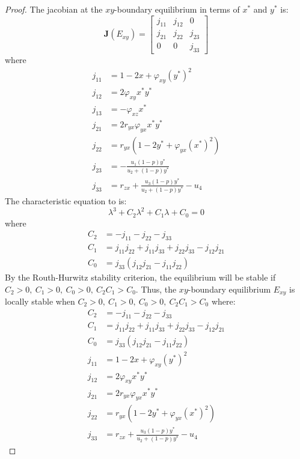 \begin{proof}
    The jacobian at the $xy$-boundary equilibrium in terms of $x^*$ and $y^*$ is:
    \begin{equation}\label{matrix:jacobian-boundary-xy}
        \textbf{J}\left(E_{xy}\right) = \begin{bmatrix}
            j_{11} & j_{12} & 0\\
            j_{21} & j_{22} & j_{23}\\
            0 & 0 & j_{33}
        \end{bmatrix}
    \end{equation}
    where
    \begin{align*}
        j_{11} &= 1-2x+\varphi_{xy}\left(y^*\right)^2\\
        j_{12} &= 2\varphi_{xy}x^*y^*\\
        j_{13} &= -\varphi_{xz}x^*\\
        j_{21} &= 2r_{yx}\varphi_{yx}x^*y^*\\
        j_{22} &= r_{yx}\left(1-2y^*+\varphi_{yx}\left(x^*\right)^2\right)\\
        j_{23} &= -\frac{u_1\left(1-p\right)y^*}{u_2+\left(1-p\right)y^*}\\
        j_{33} &= r_{zx}+\frac{u_3\left(1-p\right)y^*}{u_2+\left(1-p\right)y^*}-u_4
    \end{align*}
    The characteristic equation to  is:
    \begin{equation*}\label{eq:char-eq-xy}
        \lambda^3+C_2\lambda^2+C_1\lambda+C_0=0
    \end{equation*}
    where
    \begin{align*}
        C_2 &= -j_{11}-j_{22}-j_{33}\\
        C_1 &= j_{11}j_{22}+j_{11}j_{33}+j_{22}j_{33}-j_{12}j_{21}\\
        C_0 &= j_{33}\left(j_{12}j_{21}-j_{11}j_{22}\right)
    \end{align*}
    By the Routh-Hurwitz stability criterion, the equilibrium will be stable if $C_2>0,\ C_1>0,\ C_0>0,\ C_2C_1>C_0$. Thus, the $xy$-boundary equilibrium $E_{xy}$ is locally stable when $C_2>0,\ C_1>0,\ C_0>0,\ C_2C_1>C_0$ where:
    \begin{align*}
        C_2 &= -j_{11}-j_{22}-j_{33}\\
        C_1 &= j_{11}j_{22}+j_{11}j_{33}+j_{22}j_{33}-j_{12}j_{21}\\
        C_0 &= j_{33}\left(j_{12}j_{21}-j_{11}j_{22}\right)\\
        j_{11} &= 1-2x+\varphi_{xy}\left(y^*\right)^2\\
        j_{12} &= 2\varphi_{xy}x^*y^*\\
        j_{21} &= 2r_{yx}\varphi_{yx}x^*y^*\\
        j_{22} &= r_{yx}\left(1-2y^*+\varphi_{yx}\left(x^*\right)^2\right)\\
        j_{33} &= r_{zx}+\frac{u_3\left(1-p\right)y^*}{u_2+\left(1-p\right)y^*}-u_4
    \end{align*}
\end{proof}


